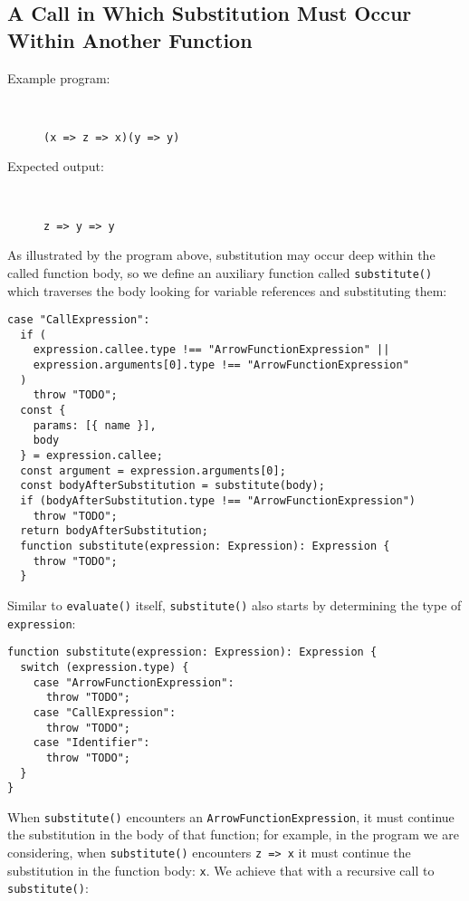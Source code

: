 \documentclass[12pt, oneside]{book}
\begin{document}
\subsection{A Call in Which Substitution Must Occur Within Another Function}

\begin{description}
\item [Example program:] ~

\begin{verbatim}
(x => z => x)(y => y)
\end{verbatim}

\item [Expected output:] ~

\begin{verbatim}
z => y => y
\end{verbatim}
\end{description}

As illustrated by the program above, substitution may occur deep within the called function body, so we define an auxiliary function called \texttt{substitute()} which traverses the body looking for variable references and substituting them:

\begin{verbatim}
case "CallExpression":
  if (
    expression.callee.type !== "ArrowFunctionExpression" ||
    expression.arguments[0].type !== "ArrowFunctionExpression"
  )
    throw "TODO";
  const {
    params: [{ name }],
    body
  } = expression.callee;
  const argument = expression.arguments[0];
  const bodyAfterSubstitution = substitute(body);
  if (bodyAfterSubstitution.type !== "ArrowFunctionExpression")
    throw "TODO";
  return bodyAfterSubstitution;
  function substitute(expression: Expression): Expression {
    throw "TODO";
  }
\end{verbatim}

Similar to \texttt{evaluate()} itself, \texttt{substitute()} also starts by determining the type of \texttt{expression}:

\begin{verbatim}
function substitute(expression: Expression): Expression {
  switch (expression.type) {
    case "ArrowFunctionExpression":
      throw "TODO";
    case "CallExpression":
      throw "TODO";
    case "Identifier":
      throw "TODO";
  }
}
\end{verbatim}

When \texttt{substitute()} encounters an \texttt{ArrowFunctionExpression}, it must continue the substitution in the body of that function; for example, in the program we are considering, when \texttt{substitute()} encounters \texttt{z => x} it must continue the substitution in the function body: \texttt{x}. We achieve that with a recursive call to \texttt{substitute()}:
\end{document}
